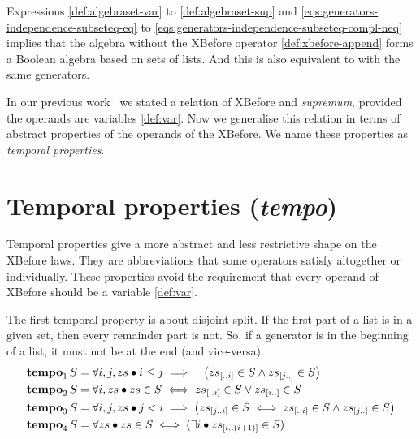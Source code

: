 \documentclass[12pt,openright,twoside,a4paper,oldfontcommands,english,brazil,final]{abntex2}
\theoremstyle{theo}
\newcommand{\sliceright}[2]{\ensuremath #1_{\left[..#2\right]}}
\newcommand{\sliceleft}[2]{\ensuremath #1_{\left[#2..\right]}}
\newcommand{\slice}[3]{\ensuremath #1_{\left[#2..#3\right]}}
\def\tempotext{tempo\xspace}
\def\tempoop{\ensuremath\operatorname{\mathbf{tempo}}}
\newcommand{\tempo}[2][1-4]{\ensuremath\tempoop_{#1} #2}
\begin{document}
Expressions \eqref{def:algebraset-var} to \eqref{def:algebraset-sup} and \eqref{eqs:generators-independence-subseteq-eq} to \eqref{eqs:generators-independence-subseteq-compl-neq} implies that the \ac{algebra} without the \ac{XBefore} operator \eqref{def:xbefore-append} forms a Boolean algebra based on sets of lists.
And this is also equivalent to  with the same generators.

In our previous work~\cite{DM2015} we stated a relation of \ac{XBefore} and \emph{supremum}, provided the operands are variables \eqref{def:var}.
Now we generalise this relation in terms of abstract properties of the operands of the \ac{XBefore}.
We name these properties as \emph{temporal properties}.

\section{Temporal properties (\emph{\tempotext})}
\label{sec:temporal-properties}

Temporal properties give a more abstract and less restrictive shape on the \ac{XBefore} laws.
They are abbreviations that some operators satisfy altogether or individually.
These properties avoid the requirement that every operand of \ac{XBefore} should be a variable \eqref{def:var}.


The first temporal property is about disjoint split.
If the first part of a list is in a given set, then every remainder part is not.
So, if a generator is in the beginning of a list, it must not be at the end (and vice-versa).
%
%
\begin{subequations}
\begin{align}
\tempo[1]{S} &= \forall i, j, zs \bullet
  i \le j \implies
  \lnot \left(
    \sliceright{zs}{i} \in S \land \sliceleft{zs}{j} \in S
  \right)\label{def:tempo1}\\
\tempo[2]{S} &= \forall i, zs \bullet
  zs \in S \iff
  \sliceright{zs}{i} \in S \lor \sliceleft{zs}{i} \in S\label{def:tempo2}\\
\tempo[3]{S} &= \forall i, j, zs \bullet
  j < i \implies
  \left(
    \slice{zs}{j}{i} \in S \iff \sliceright{zs}{i} \in S \land \sliceleft{zs}{j} \in S
  \right)\label{def:tempo3}\\
\tempo[4]{S} &= \forall zs \bullet zs \in S \iff (\exists i \bullet \slice{zs}{i}{\left(i+1\right)} \in S)\label{def:tempo4}
\end{align}
\end{subequations}
\end{document}
